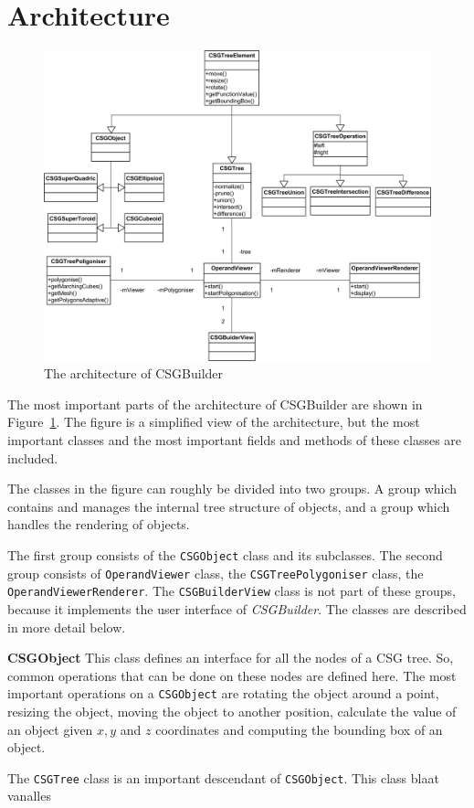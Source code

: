 \documentclass[a4paper,10pt,twocolumn]{article}
\begin{document}
\section{Architecture}
\begin{figure}[!t]
    \includegraphics[width=\textwidth]{./images/architecture}
    \caption{The architecture of CSGBuilder}
    \label{figure:architecture}
\end{figure}

The most important parts of the architecture of CSGBuilder are shown in Figure~\ref{figure:architecture}. The figure is a simplified view of the architecture, but the most important classes and the most important fields and methods of these classes are included.

The classes in the figure can roughly be divided into two groups. A group which contains and manages the internal tree structure of objects, and a group which handles the rendering of objects.

The first group consists of the \texttt{CSGObject} class and its subclasses. The second group consists of \texttt{OperandViewer} class, the \texttt{CSGTreePolygoniser} class, the \texttt{OperandViewerRenderer}. The \texttt{CSGBuilderView} class is not part of these groups, because it implements the user interface of \textit{CSGBuilder}. The classes are described in more detail below.

\begin{list}{}{\leftmargin=0em}
    \item[] \textbf{CSGObject} This class defines an interface for all the nodes of a CSG tree. So, common operations that can be done on these nodes are defined here. The most important operations on a \texttt{CSGObject} are rotating the object around a point, resizing the object, moving the object to another position, calculate the value of an object given $x, y$ and $z$ coordinates and computing the bounding box of an object.

        The \texttt{CSGTree} class is an important descendant of \texttt{CSGObject}. This class blaat vanalles
\end{list}
\end{document}

